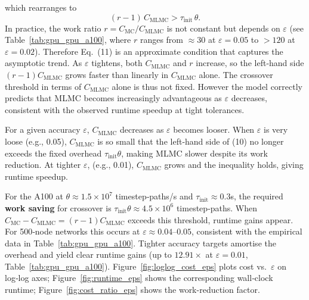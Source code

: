 \documentclass{ieeeaccess}
\begin{document}
which rearranges to
\begin{equation}
    (r-1)\,C_{\mathrm{MLMC}} > \tau_{\text{init}}\,\theta.
\end{equation}
In practice, the work ratio \(r = C_{\mathrm{MC}} / C_{\mathrm{MLMC}}\) is not constant but depends on \(\varepsilon\) (see Table~\ref{tab:gpu_gpu_a100}, where \(r\) ranges from \(\approx 30\) at \(\varepsilon = 0.05\) to \(>120\) at \(\varepsilon = 0.02\)). Therefore Eq.~(11) is an approximate condition that captures the asymptotic trend. As \(\varepsilon\) tightens, both \(C_{\mathrm{MLMC}}\) and \(r\) increase, so the left‑hand side \((r-1)C_{\mathrm{MLMC}}\) grows faster than linearly in \(C_{\mathrm{MLMC}}\) alone. The crossover threshold in terms of \(C_{\mathrm{MLMC}}\) alone is thus not fixed. However the model correctly predicts that MLMC becomes increasingly advantageous as \(\varepsilon\) decreases, consistent with the observed runtime speedup at tight tolerances.

For a given accuracy \(\varepsilon\), \(C_{\mathrm{MLMC}}\) decreases as \(\varepsilon\) becomes looser. When \(\varepsilon\) is very loose (e.g., 0.05), \(C_{\mathrm{MLMC}}\) is so small that the left‑hand side of (10) no longer exceeds the fixed overhead \(\tau_{\text{init}}\theta\), making MLMC slower despite its work reduction. At tighter \(\varepsilon\), (e.g., 0.01), \(C_{\mathrm{MLMC}}\) grows and the inequality holds, giving runtime speedup.

For the A100 at \(\theta \approx 1.5\times10^7\) timestep‑paths/s and \(\tau_{\text{init}} \approx 0.3\)s, the required \textbf{work saving} for crossover is \(\tau_{\text{init}}\theta \approx 4.5\times10^6\) timestep‑paths. When \(C_{\mathrm{MC}} - C_{\mathrm{MLMC}} = (r-1)C_{\mathrm{MLMC}}\) exceeds this threshold, runtime gains appear. For 500‑node networks this occurs at \(\varepsilon \approx 0.04\)–\(0.05\), consistent with the empirical data in Table~\ref{tab:gpu_gpu_a100}. Tighter accuracy targets amortise the overhead and yield clear runtime gains (up to \(12.91\times\) at \(\varepsilon=0.01\), Table~\ref{tab:gpu_gpu_a100}). Figure~\ref{fig:loglog_cost_eps} plots cost vs.\ \(\varepsilon\) on log‑log axes; Figure~\ref{fig:runtime_eps} shows the corresponding wall‑clock runtime; Figure~\ref{fig:cost_ratio_eps} shows the work-reduction factor.
\end{document}
